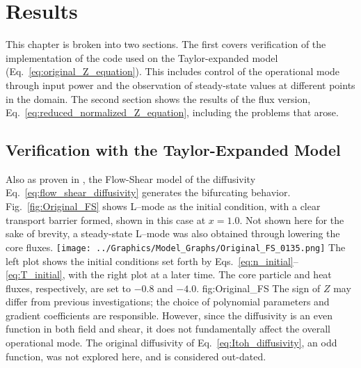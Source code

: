 \chapter{Results}\label{chapter:results}
This chapter is broken into two sections.
The first covers verification of the implementation of the code used on the Taylor-expanded model (Eq.~\ref{eq:original_Z_equation}).
This includes control of the operational mode through input power and the observation of steady-state values at different points in the domain.
The second section shows the results of the flux version, Eq.~\ref{eq:reduced_normalized_Z_equation}, including the problems that arose.

\section{Verification with the Taylor-Expanded Model} \label{sec:original_results}
Also as proven in \cite{paquay_studying_2012}, the Flow-Shear model of the diffusivity Eq.~\ref{eq:flow_shear_diffusivity} generates the bifurcating behavior.
Fig.~\ref{fig:Original_FS} shows L--mode as the initial condition, with a clear transport barrier formed, shown in this case at $x = 1.0$.
Not shown here for the sake of brevity, a steady-state L--mode was also obtained through lowering the core fluxes.
	{\texttt{[image: ../Graphics/Model\_Graphs/Original\_FS\_0135.png]}}
	{The left plot shows the initial conditions set forth by Eqs.~\ref{eq:n_initial}--\ref{eq:T_initial}, with the right plot at a later time.
	The core particle and heat fluxes, respectively, are set to $-0.8$ and $-4.0$.}
	{fig:Original_FS}
The sign of $Z$ may differ from previous investigations; the choice of polynomial parameters and gradient coefficients are responsible.
However, since the diffusivity is an even function in both field and shear, it does not fundamentally affect the overall operational mode.
The original diffusivity of Eq.~\ref{eq:Itoh_diffusivity}, an odd function, was not explored here, and is considered out-dated.

